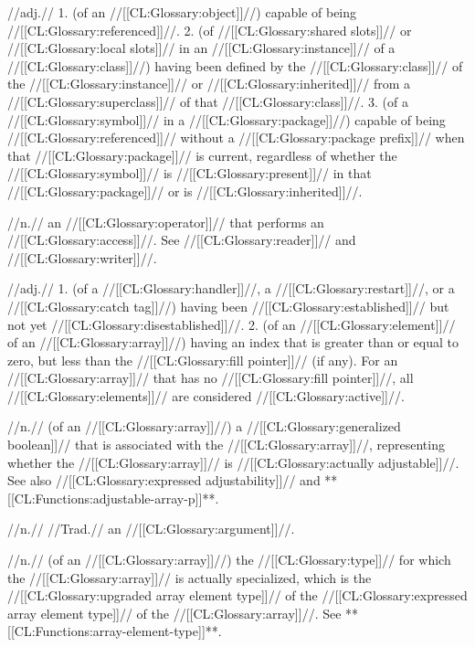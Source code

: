 //adj.// 1. (of an //[[CL:Glossary:object]]//) capable of being //[[CL:Glossary:referenced]]//. 2. (of //[[CL:Glossary:shared slots]]// or //[[CL:Glossary:local slots]]// in an //[[CL:Glossary:instance]]// of a //[[CL:Glossary:class]]//) having been defined by the //[[CL:Glossary:class]]// of the //[[CL:Glossary:instance]]// or //[[CL:Glossary:inherited]]// from a //[[CL:Glossary:superclass]]// of that //[[CL:Glossary:class]]//. 3. (of a //[[CL:Glossary:symbol]]// in a //[[CL:Glossary:package]]//) capable of being //[[CL:Glossary:referenced]]// without a //[[CL:Glossary:package prefix]]// when that //[[CL:Glossary:package]]// is current, regardless of whether the //[[CL:Glossary:symbol]]// is //[[CL:Glossary:present]]// in that //[[CL:Glossary:package]]// or is //[[CL:Glossary:inherited]]//.

 //n.// an //[[CL:Glossary:operator]]// that performs an //[[CL:Glossary:access]]//. See //[[CL:Glossary:reader]]// and //[[CL:Glossary:writer]]//.

 //adj.// 1. (of a //[[CL:Glossary:handler]]//, a //[[CL:Glossary:restart]]//, or a //[[CL:Glossary:catch tag]]//) having been //[[CL:Glossary:established]]// but not yet //[[CL:Glossary:disestablished]]//. 2. (of an //[[CL:Glossary:element]]// of an //[[CL:Glossary:array]]//) having an index that is greater than or equal to zero, but less than the //[[CL:Glossary:fill pointer]]// (if any). For an //[[CL:Glossary:array]]// that has no //[[CL:Glossary:fill pointer]]//, all //[[CL:Glossary:elements]]// are considered //[[CL:Glossary:active]]//.

 //n.// (of an //[[CL:Glossary:array]]//) a //[[CL:Glossary:generalized boolean]]// that is associated with the //[[CL:Glossary:array]]//, representing whether the //[[CL:Glossary:array]]// is //[[CL:Glossary:actually adjustable]]//. See also //[[CL:Glossary:expressed adjustability]]// and **[[CL:Functions:adjustable-array-p]]**.

 //n.// //Trad.// an //[[CL:Glossary:argument]]//.

 //n.// (of an //[[CL:Glossary:array]]//) the //[[CL:Glossary:type]]// for which the //[[CL:Glossary:array]]// is actually specialized, which is the //[[CL:Glossary:upgraded array element type]]// of the //[[CL:Glossary:expressed array element type]]// of the //[[CL:Glossary:array]]//. See **[[CL:Functions:array-element-type]]**.

